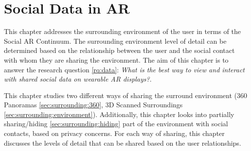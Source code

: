 \chapter{Social Data in AR} %
\label{ch:data} %

This chapter addresses the surrounding environment of the user in terms of the Social AR Continuum. The surrounding environment level of detail can be determined based on the relationship between the user and the social contact with whom they are sharing the environment. The aim of this chapter is to answer the research question \ref{rq:data}: \textit{What is the best way to view and interact with shared social data on wearable AR displays?}. 


This chapter studies two different ways of sharing the surround environment (360 Panoramas \ref{sec:surrounding:360}, 3D Scanned Surroundings \ref{sec:surrounding:environment}). Additionally, this chapter looks into partially sharing/hiding \ref{sec:surrounding:hiding} part of the environment with social contacts, based on privacy concerns. For each way of sharing, this chapter discusses the levels of detail that can be shared based on the user relationships. 





